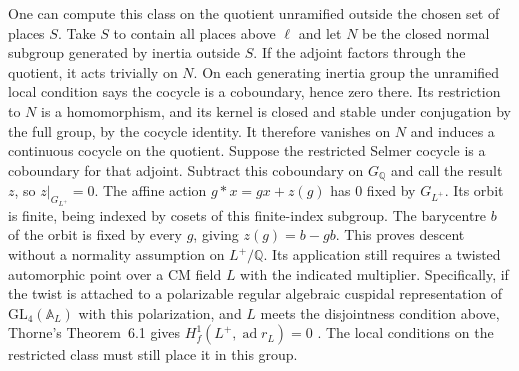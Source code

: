 \documentclass[11pt]{amsart}
\theoremstyle{definition}
\theoremstyle{remark}
\begin{document}
One can compute this class on the quotient unramified outside the
chosen set of places $S$. Take $S$ to contain all places above
$\ell$ and let $N$ be the closed normal subgroup generated by
inertia outside $S$.
If the adjoint factors through the quotient, it acts trivially on
$N$. On each generating inertia group the unramified local condition
says the cocycle is a coboundary, hence zero there. Its restriction
to $N$ is a homomorphism, and its kernel is closed and stable under
conjugation by the full group, by the cocycle identity. It therefore
vanishes on $N$ and induces a continuous cocycle on the quotient.
Suppose the restricted Selmer cocycle is a coboundary for that
adjoint. Subtract this coboundary on $G_{\mathbb Q}$ and call the
result $z$, so $z|_{G_{L^+}}=0$. The affine action
$g*x=gx+z(g)$ has $0$ fixed by $G_{L^+}$. Its orbit is finite,
being indexed by cosets of this finite-index subgroup. The
barycentre $b$ of the orbit is fixed by every $g$, giving
$z(g)=b-gb$. This proves descent without a normality assumption on
$L^+/\mathbb Q$. Its application still requires a twisted automorphic
point over a CM field $L$ with the indicated multiplier. Specifically,
if the twist is attached to a polarizable regular algebraic cuspidal
representation of $\mathrm{GL}_4(\mathbb A_L)$ with this polarization,
and $L$ meets the disjointness condition above, Thorne's
Theorem~6.1 gives $H^1_f(L^+,\operatorname{ad}r_L)=0$
\cite{ThorneAdj}. The local conditions on the restricted class
must still place it in this group.
\end{document}

